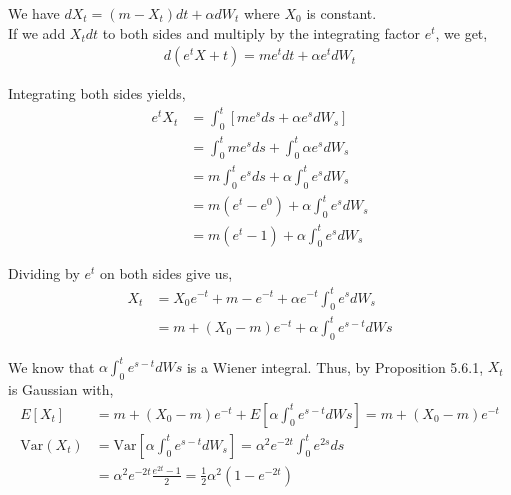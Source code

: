 \documentclass[12pt]{article}
\newenvironment{problem}[2][Problem]{\begin{trivlist}
\item[\hskip \labelsep {\bfseries #1}\hskip \labelsep {\bfseries #2.}]}{\end{trivlist}}
\begin{document}
\begin{problem}{29}
\end{problem}

We have $dX_t = (m - X_t)dt + \alpha dW_t$ where $X_0$ is constant.\\

If we add $X_tdt$ to both sides and multiply by the integrating factor $e^t$, we get,
\begin{align*}
d(e^tX+t) = me^tdt + \alpha e^t dW_t
\end{align*}

Integrating both sides yields,
\begin{align*}
e^tX_t &= \int_0^t \left[me^sds + \alpha e^s dW_s\right]\\
&= \int_0^t me^sds + \int_0^t \alpha e^s dW_s\\
&= m \int_0^t e^sds + \alpha \int_0^t e^s dW_s\\
&= m(e^t - e^0) + \alpha \int_0^t e^s dW_s\\
&= m(e^t - 1) + \alpha \int_0^t e^s dW_s
\end{align*}

Dividing by $e^t$ on both sides give us,
\begin{align*}
X_t &= X_0e^{-t} + m - e^{-t} + \alpha e^{-t} \int_0^t e^s dW_s\\
&= m + (X_0 - m)e^{-t} + \alpha \int_0^t e^{s-t} dWs
\end{align*}

We know that $\alpha \int_0^t e^{s-t} dWs$ is a Wiener integral. Thus, by Proposition 5.6.1, $X_t$ is Gaussian with,
\begin{align*}
E[X_t] &= m + (X_0 - m)e^{-t} + E\left[\alpha \int_0^t e^{s-t} dWs \right] = m + (X_0 - m)e^{-t}\\
\text{Var}(X_t) &= \text{Var}\left[\alpha \int_0^t e^{s-t} dW_s\right] = \alpha^2e^{-2t} \int_0^t e^{2s} ds\\
&= \alpha^2 e^{-2t}\frac{e^{2t} - 1}{2} = \frac{1}{2} \alpha^2(1 - e^{-2t})
\end{align*}

\begin{problem}{30}
\end{problem}

\begin{problem}{31}
\end{problem}
\end{document}
